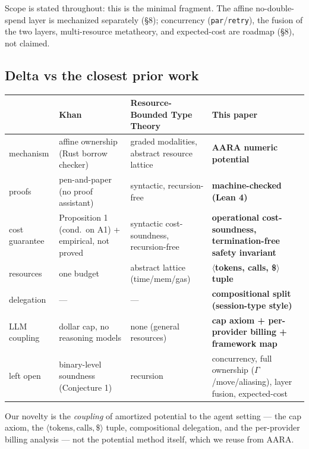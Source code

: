 \documentclass[11pt]{article}
\theoremstyle{plain}
\begin{document}
Scope is stated throughout: this is the minimal fragment. The affine no-double-spend layer is
mechanized separately (\S8); concurrency (\texttt{par}/\texttt{retry}), the fusion of the two
layers, multi-resource metatheory, and expected-cost are roadmap (\S8), not claimed.

\subsection{Delta vs the closest prior work}

\begin{center}\footnotesize
\begin{tabular}{@{}R{1.7cm}R{3.4cm}R{3.6cm}R{4.9cm}@{}}
\toprule
 & Khan~\cite{khan2026} & Resource-Bounded Type Theory~\cite{rbtt2025} & \textbf{This paper} \\
\midrule
mechanism & affine ownership (Rust borrow checker) & graded modalities, abstract resource lattice
  & \textbf{AARA numeric potential} \\
proofs & pen-and-paper (no proof assistant) & syntactic, recursion-free
  & \textbf{machine-checked (Lean 4)} \\
cost guarantee & Proposition 1 (cond.\ on A1) + empirical, not proved & syntactic cost-soundness,
  recursion-free & \textbf{operational cost-soundness, termination-free safety invariant} \\
resources & one budget & abstract lattice (time/mem/gas)
  & \boldmath$\langle$\textbf{tokens, calls, \$}$\rangle$ \textbf{tuple} \\
delegation & --- & --- & \textbf{compositional split (session-type style)} \\
LLM coupling & dollar cap, no reasoning models & none (general resources)
  & \textbf{cap axiom + per-provider billing + framework map} \\
left open & binary-level soundness (Conjecture 1) & recursion
  & concurrency, full ownership ($\Gamma$/move/aliasing), layer fusion, expected-cost \\
\bottomrule
\end{tabular}
\end{center}

Our novelty is the \emph{coupling} of amortized potential to the agent setting --- the cap axiom,
the $\langle\text{tokens},\text{calls},\$\rangle$ tuple, compositional delegation, and the
per-provider billing analysis --- not the potential method itself, which we reuse from AARA.

\end{document}

